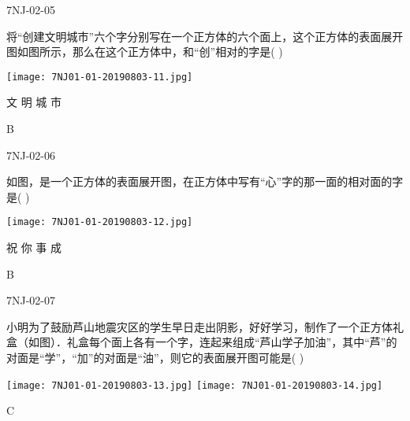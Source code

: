 \begin{defproblem}{7NJ-02-05}%
\begin{onlyproblem}%
将“创建文明城市”六个字分别写在一个正方体的六个面上，这个正方体的表面展开图如图所示，那么在这个正方体中，和“创”相对的字是(    ) 
\begin{center}
\texttt{[image: 7NJ01-01-20190803-11.jpg]}
\end{center}

\xx
{文}
{明}
{城}
{市}

\end{onlyproblem}%
\begin{onlysolution}%
\begin{solution}%
B
\end{solution}%
\end{onlysolution}%
\end{defproblem}




\begin{defproblem}{7NJ-02-06}%
\begin{onlyproblem}%
如图，是一个正方体的表面展开图，在正方体中写有“心”字的那一面的相对面的字是(    ) 
\begin{center}
\texttt{[image: 7NJ01-01-20190803-12.jpg]}
\end{center}

\xx
{祝}
{你}
{事}
{成}

\end{onlyproblem}%
\begin{onlysolution}%
\begin{solution}%
B
\end{solution}%
\end{onlysolution}%
\end{defproblem}



\begin{defproblem}{7NJ-02-07}%
\begin{onlyproblem}%
小明为了鼓励芦山地震灾区的学生早日走出阴影，好好学习，制作了一个正方体礼盒（如图）．礼盒每个面上各有一个字，连起来组成“芦山学子加油”，其中“芦”的对面是“学”，“加”的对面是“油”，则它的表面展开图可能是(    ) 
\begin{center}
\texttt{[image: 7NJ01-01-20190803-13.jpg]}
\texttt{[image: 7NJ01-01-20190803-14.jpg]}
\end{center}


\end{onlyproblem}%
\begin{onlysolution}%
\begin{solution}%
C
\end{solution}%
\end{onlysolution}%
\end{defproblem}




